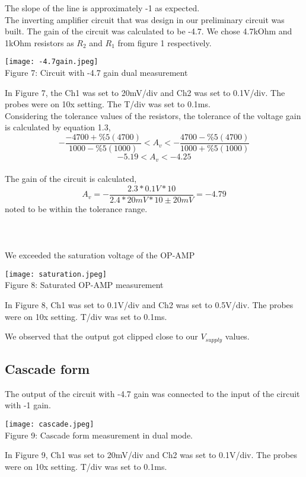 \documentclass{article}
\begin{document}
The slope of the line is approximately -1 as expected.\\

The inverting amplifier circuit that was design in our preliminary circuit was built. The gain of the circuit was calculated to be -4.7. We chose 4.7kOhm and 1kOhm resistors as  $R_2$ and $R_1$ from figure 1 respectively.

\begin{center}
    \texttt{[image: -4.7gain.jpeg]}\\
    Figure 7: Circuit with -4.7 gain dual measurement
\end{center}
In Figure 7, the Ch1 was set to 20mV/div and Ch2 was set to 0.1V/div. The probes were on 10x setting. The T/div was set to 0.1ms. \\

Considering the tolerance values of the resistors, the tolerance of the voltage gain is calculated by equation 1.3,
\[-\frac{-4700 + \%5(4700)}{1000 - \%5(1000)} < A_v < -\frac{4700 - \%5(4700)}{1000 + \%5(1000)}\]
\[-5.19 < A_v < -4.25\] \\

The gain of the circuit is calculated,
\[A_v = -\frac{2.3*0.1V*10}{2.4*20mV*10 \pm 20mV} =- 4.79\]
\quad noted to be within the tolerance range.\\
\\ 
\\ 
\\

We exceeded the saturation voltage of the OP-AMP

\begin{center}
    \texttt{[image: saturation.jpeg]} \\
    Figure 8: Saturated OP-AMP measurement
\end{center}
In Figure 8, Ch1 was set to 0.1V/div and Ch2 was set to 0.5V/div. The probes were on 10x setting. T/div was set to 0.1ms.

We observed that the output got clipped close to our $V_{supply}$ values.

\subsection{Cascade form}

The output of the circuit with -4.7 gain was connected to the input of the circuit with -1 gain.

\begin{center}
    \texttt{[image: cascade.jpeg]} \\
    Figure 9: Cascade form measurement in dual mode.
\end{center}
In Figure 9, Ch1 was set to 20mV/div and Ch2 was set to 0.1V/div. The probes were on 10x setting. T/div was set to 0.1ms. \\
\end{document}
